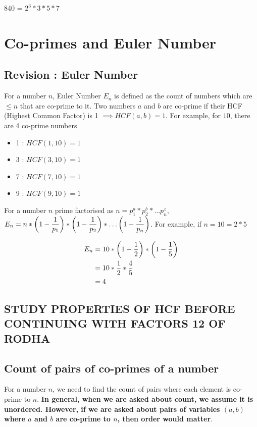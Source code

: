 840 = $2^3 * 3 * 5 * 7$

\section{Co-primes and Euler Number}

\subsection{Revision : Euler Number}
For a number $n$, Euler Number $E_n$ is defined as the count of numbers which are $\leq n$ that are co-prime to it. Two numbers $a$ and $b$ are co-prime if their HCF (Highest Common Factor) is 1 $\implies HCF(a,b) = 1$. For example, for $10$, there are 4 co-prime numbers
\begin{itemize}
    \item 1 : $HCF(1,10) = 1$
    \item 3 : $HCF(3,10) = 1$
    \item 7 : $HCF(7,10) = 1$
    \item 9 : $HCF(9,10) = 1$
\end{itemize}

For a number $n$ prime factorised as $n = p_1^a * p_2^b * \ldots p_n^z$, $E_n = n * \left ( 1 - \dfrac{1}{p_1} \right ) * \left ( 1 - \dfrac{1}{p_2} \right ) * \ldots \left ( 1 - \dfrac{1}{p_n} \right )$. For example, if $n = 10 = 2 * 5$

\begin{align*}
    E_n &= 10 * \left ( 1 - \dfrac{1}{2} \right ) * \left ( 1 - \dfrac{1}{5} \right ) \\
    &= 10 * \dfrac{1}{2} * \dfrac{4}{5} \\
    &= 4 
\end{align*}

\subsection{STUDY PROPERTIES OF HCF BEFORE CONTINUING WITH FACTORS 12 OF RODHA}

\subsection{Count of pairs of co-primes of a number}

For a number $n$, we need to find the count of pairs where each element is co-prime to $n$. \textbf{In general, when we are asked about count, we assume it is unordered. However, if we are asked about pairs of variables $(a,b)$ where $a$ and $b$ are co-prime to $n$, then order would matter}. 

